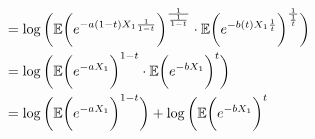 \begin{align}
                                        &=      \log\bigg( 
                                                            \E
                                                                \bigg(
                                                                    e^{-a(1-t) X_1 \frac{1}{1-t}}
                                                                \bigg)^{\frac{1}{\frac{1}{1-t}}} 
                                                        \cdot    
                                                            \E
                                                                \bigg(
                                                                    e^{-b(t) X_1 \frac{1}{t}}
                                                                \bigg)^\frac{1}{\frac{1}{t}}
                                                     \bigg)                                                                         \\
                                        &=      \log\bigg( 
                                                        \E
                                                            \bigg(
                                                                e^{-a X_1}
                                                            \bigg)^{1-t} 
                                                        \cdot                                                             
                                                        \E
                                                            \bigg(
                                                                e^{-b X_1}
                                                            \bigg)^{t}
                                                     \bigg)                                                                         \\
                                        &=      \log\bigg( 
                                                        \E
                                                            \bigg(
                                                                e^{-a X_1}
                                                            \bigg)^{1-t} 
                                                \bigg)
                                                        + 
                                                \log\bigg(
                                                        \E
                                                            \bigg(
                                                                e^{-b X_1}
                                                            \bigg)^{t}

\end{align}
